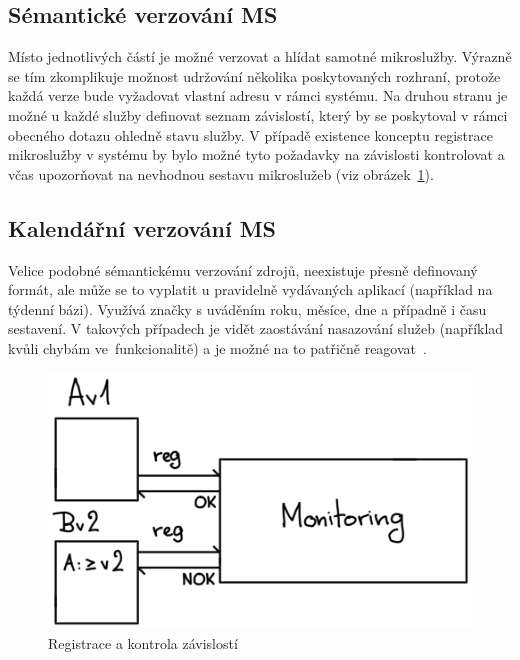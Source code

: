 \subsection{Sémantické verzování MS}\label{subsec:msa-dependencies-msa}
Místo jednotlivých částí  je možné verzovat a hlídat samotné mikroslužby.
Výrazně se tím zkomplikuje možnost udržování několika poskytovaných rozhraní, protože každá verze bude vyžadovat vlastní adresu v rámci systému.
Na druhou stranu je možné u každé služby definovat seznam závislostí, který by se poskytoval v rámci obecného dotazu ohledně stavu služby.
V případě existence konceptu registrace mikroslužby v systému by bylo možné tyto požadavky na závislosti kontrolovat a včas upozorňovat na nevhodnou sestavu mikroslužeb (viz obrázek~\ref{fig:version-reg}).


\subsection{Kalendářní verzování MS}\label{subsec:msa-dependencies-calendar}

Velice podobné sémantickému verzování zdrojů, neexistuje přesně definovaný formát, ale může se to vyplatit u pravidelně vydávaných aplikací (například na týdenní bázi).
Využívá značky s uváděním roku, měsíce, dne a případně i času sestavení.
V takových případech je vidět zaostávání nasazování služeb (například kvůli chybám ve~funkcionalitě) a je možné na to patřičně reagovat~\cite{msversions}.

\begin{figure}[htbp]
   \centering
   \includegraphics[max width=\textwidth]{assets/version-reg}
   \caption{Registrace  a kontrola závislostí}\label{fig:version-reg}
\end{figure}

